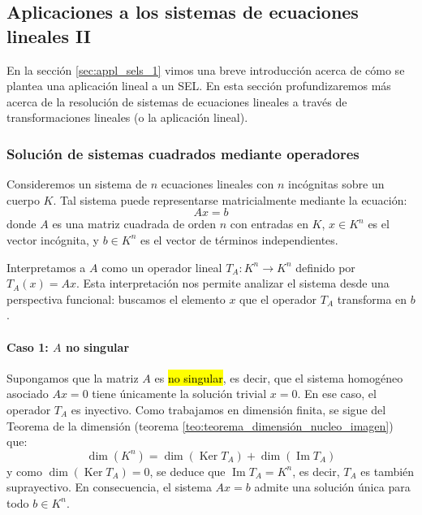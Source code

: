 \subsection{Aplicaciones a los sistemas de ecuaciones lineales II}

En la sección \ref{sec:appl_sels_1} vimos una breve introducción acerca de cómo se plantea una aplicación lineal a un SEL. En esta sección profundizaremos más acerca de la resolución de sistemas de ecuaciones lineales a través de transformaciones lineales (o la aplicación lineal).

\subsubsection{Solución de sistemas cuadrados mediante operadores}

Consideremos un sistema de \(n\) ecuaciones lineales con \(n\) incógnitas sobre un cuerpo \(K\). Tal sistema puede representarse matricialmente mediante la ecuación:
\begin{equation}
  Ax = b
  \label{eq:sistema_lineal_5}  
\end{equation}
donde \(A\) es una matriz cuadrada de orden \(n\) con entradas en \(K\), \(x \in K^n\) es el vector incógnita, y \(b \in K^n\) es el vector de términos independientes.

Interpretamos a \(A\) como un operador lineal \(T_A : K^n \rightarrow K^n\) definido por \(T_A(x) = Ax\). Esta interpretación nos permite analizar el sistema desde una perspectiva funcional: buscamos el elemento \(x\) que el operador \(T_A\) transforma en \(b\).

\paragraph{Caso 1: \(A\) no singular}

Supongamos que la matriz \(A\) es \hl{no singular}, es decir, que el sistema homogéneo asociado \(Ax = 0\) tiene únicamente la solución trivial \(x = 0\). En ese caso, el operador \(T_A\) es inyectivo. Como trabajamos en dimensión finita, se sigue del Teorema de la dimensión (teorema \ref{teo:teorema_dimensión_nucleo_imagen}) que:
\[
\dim(K^n) = \dim(\operatorname{Ker} T_A) + \dim(\operatorname{Im} T_A)
\]
y como \(\dim(\operatorname{Ker} T_A) = 0\), se deduce que \(\operatorname{Im} T_A = K^n\), es decir, \(T_A\) es también suprayectivo. En consecuencia, el sistema \(Ax = b\) admite una solución única para todo \(b \in K^n\).

